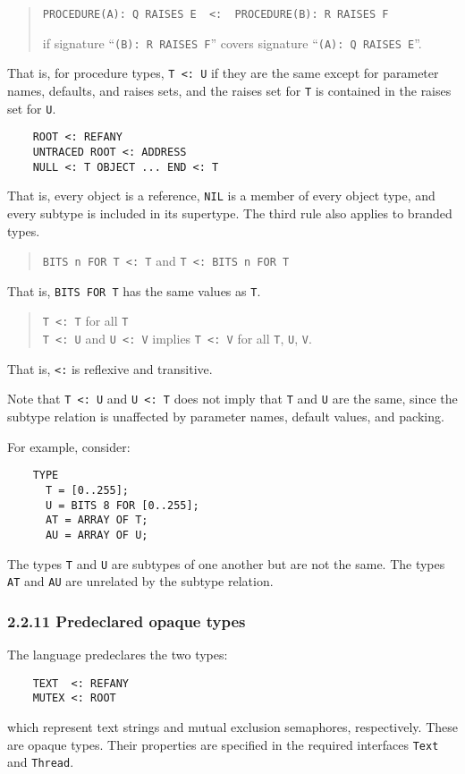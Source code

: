 \documentclass[10pt]{article}
\begin{document}
\begin{quote}
\begin{verbatim}
PROCEDURE(A): Q RAISES E  <:  PROCEDURE(B): R RAISES F
\end{verbatim}
  if signature ``\verb|(B): R RAISES F|'' covers signature
  ``\verb|(A): Q RAISES E|''.
\end{quote}
That is, for procedure types, \verb|T <: U| if they are the same except for
parameter names, defaults, and raises sets, and the raises set for \verb|T| is
contained in the raises set for \verb|U|.

\begin{verbatim}
    ROOT <: REFANY
    UNTRACED ROOT <: ADDRESS
    NULL <: T OBJECT ... END <: T
\end{verbatim}
That is, every object is a reference, \verb|NIL| is a member of every object
type, and every subtype is included in its supertype.  The third rule also
applies to branded types.

\begin{quote}
  \verb|BITS n FOR T <: T| and \verb|T <: BITS n FOR T|
\end{quote}
That is, \verb|BITS FOR T| has the same values as \verb|T|.

\begin{quote}
  \verb|T <: T| for all \verb|T| \\
  \verb|T <: U| and \verb|U <: V| implies \verb|T <: V| for all \verb|T|,
  \verb|U|, \verb|V|.
\end{quote}
That is, \verb|<:| is reflexive and transitive.

Note that \verb|T <: U| and \verb|U <: T| does not imply that \verb|T| and
\verb|U| are the same, since the subtype relation is unaffected by parameter
names, default values, and packing.

For example, consider:
\begin{verbatim}
    TYPE
      T = [0..255];
      U = BITS 8 FOR [0..255];
      AT = ARRAY OF T;
      AU = ARRAY OF U;
\end{verbatim}
The types \verb|T| and \verb|U| are subtypes of one another but are not the
same.  The types \verb|AT| and \verb|AU| are unrelated by the subtype
relation.

\subsubsection*{2.2.11 Predeclared opaque types}

The language predeclares the two types:
\begin{verbatim}
    TEXT  <: REFANY
    MUTEX <: ROOT
\end{verbatim}
which represent text strings and mutual exclusion semaphores, respectively.
These are opaque types.  Their properties are specified in the required
interfaces \verb|Text| and \verb|Thread|.
\end{document}
